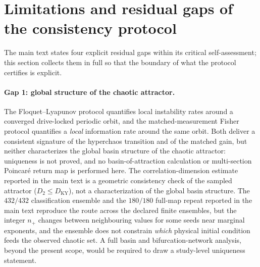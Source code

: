 \documentclass[preprint,numbers,a4paper]{elsarticle}
\begin{document}
\section{Limitations and residual gaps of the consistency protocol}
\label{SI-sec:limitations}

The main text states four explicit residual gaps within its critical self-assessment; this section collects them in full so that the boundary of what the protocol certifies is explicit.

\paragraph{Gap 1: global structure of the chaotic attractor.}
The Floquet--Lyapunov protocol quantifies local instability rates around a converged drive-locked periodic orbit, and the matched-measurement Fisher protocol quantifies a \emph{local} information rate around the same orbit. Both deliver a consistent signature of the hyperchaos transition and of the matched gain, but neither characterizes the global basin structure of the chaotic attractor: uniqueness is not proved, and no basin-of-attraction calculation or multi-section Poincar\'e return map is performed here. The correlation-dimension estimate reported in the main text is a geometric consistency check of the sampled attractor ($D_2\le D_{\mathrm{KY}}$), not a characterization of the global basin structure. The $\num{432}/\num{432}$ classification ensemble and the $\num{180}/\num{180}$ full-map repeat reported in the main text reproduce the route across the declared finite ensembles, but the integer $n_+$ changes between neighbouring values for some seeds near marginal exponents, and the ensemble does not constrain \emph{which} physical initial condition feeds the observed chaotic set. A full basin and bifurcation-network analysis, beyond the present scope, would be required to draw a study-level uniqueness statement.
\end{document}
